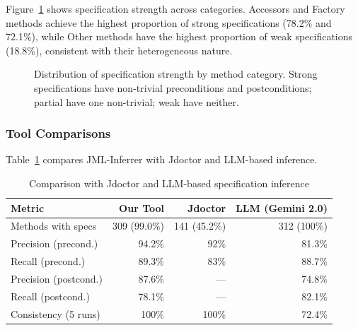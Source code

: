 Figure~\ref{fig:spec-strength} shows specification strength across categories. Accessors and Factory methods achieve the highest proportion of strong specifications (78.2\% and 72.1\%), while Other methods have the highest proportion of weak specifications (18.8\%), consistent with their heterogeneous nature.

\begin{figure}[ht]
\centering
{}
\caption{Distribution of specification strength by method category. Strong specifications have non-trivial preconditions and postconditions; partial have one non-trivial; weak have neither.}
\label{fig:spec-strength}
\end{figure}

\subsubsection{Tool Comparisons}

Table~\ref{tab:jdoctor-comparison} compares JML-Inferrer with Jdoctor and LLM-based inference.

\begin{table}[ht]
\centering
\caption{Comparison with Jdoctor and LLM-based specification inference}
\label{tab:jdoctor-comparison}
\small
\begin{tabular}{lrrr}
\toprule
\textbf{Metric} & \textbf{Our Tool} & \textbf{Jdoctor} & \textbf{LLM (Gemini 2.0)} \\
\midrule
Methods with specs & 309 (99.0\%) & 141 (45.2\%) & 312 (100\%) \\
Precision (precond.) & 94.2\% & 92\% & 81.3\% \\
Recall (precond.) & 89.3\% & 83\% & 88.7\% \\
Precision (postcond.) & 87.6\% & --- & 74.8\% \\
Recall (postcond.) & 78.1\% & --- & 82.1\% \\
Consistency (5 runs) & 100\% & 100\% & 72.4\% \\
\bottomrule
\end{tabular}
\end{table}

